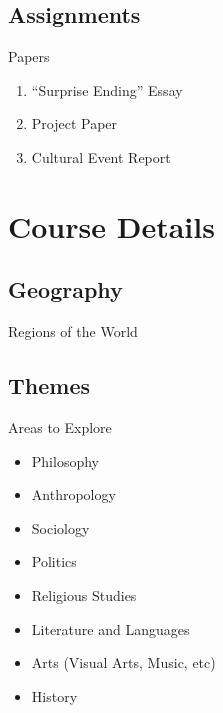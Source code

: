 

\subsection{Assignments}
\begin{frame}{Papers}
	\begin{enumerate}
		\item<1->``Surprise Ending'' Essay
		\item<2->Project Paper
		\item<3->Cultural Event Report
	\end{enumerate}
\end{frame}

\section{Course Details}
\subsection{Geography}
\begin{frame}{Regions of the World}
\end{frame}

\subsection{Themes}
\begin{frame}{Areas to Explore}
	\begin{itemize}
		\item<1->Philosophy
		\item<2->Anthropology
		\item<2->Sociology
		\item<3->Politics
		\item<3->Religious Studies
		\item<4->Literature and Languages
		\item<4->Arts (Visual Arts, Music, etc)
		\item<5->History
	\end{itemize}
\end{frame}

\timeout